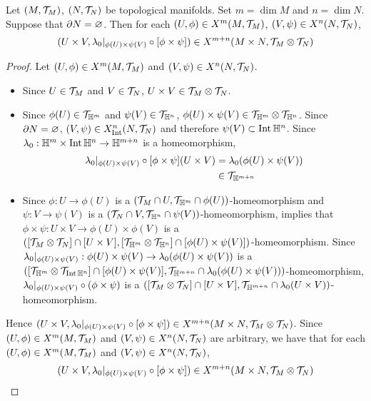 \documentclass{book}
\begin{document}
\begin{ex} 
	Let $(M, \mathcal{T}_M)$, $(N, \mathcal{T}_N)$ be topological manifolds. Set $m = \dim M$ and $n = \dim N$. Suppose that $\partial N = \varnothing$. Then for each $(U, \phi) \in X^m(M, \mathcal{T}_M)$, $(V, \psi) \in X^n(N, \mathcal{T}_N)$, 
	$$(U \times V, \lambda_0|_{\phi(U) \times \psi(V)} \circ [\phi \times \psi]) \in X^{m+n}(M \times N, \mathcal{T}_M \otimes \mathcal{T}_N)$$ 
\end{ex}

\begin{proof}
	Let $(U, \phi) \in X^m(M, \mathcal{T}_M)$ and $(V, \psi) \in X^n(N, \mathcal{T}_N)$. 
	\begin{itemize}
		\item Since $U \in \mathcal{T}_M$ and $V \in \mathcal{T}_N$, $U \times V \in \mathcal{T}_M \otimes \mathcal{T}_N$. 
		\item Since $\phi(U) \in \mathcal{T}_{\mathbb{H}^m}$ and $\psi(V) \in \mathcal{T}_{\mathbb{H}^n}$, $\phi(U) \times \psi(V) \in \mathcal{T}_{\mathbb{H}^m} \otimes \mathcal{T}_{\mathbb{H}^n}$. Since $\partial N = \varnothing$, $(V, \psi) \in X^n_{\operatorname{Int}}(N, \mathcal{T}_N)$ and therefore $\psi(V) \subset \operatorname{Int} \mathbb{H}^n$. Since $\lambda_0: \mathbb{H}^m \times \operatorname{Int} \mathbb{H}^n \rightarrow \mathbb{H}^{m+n}$ is a homeomorphism, 
		\begin{align*}
			\lambda_0|_{\phi(U) \times \psi(V)} \circ [\phi \times \psi](U \times V)
			& = \lambda_0 (\phi(U) \times \psi(V)) \\
			& \in \mathcal{T}_{\mathbb{H}^{m+n}}
		\end{align*}
		\item Since $\phi:U \rightarrow \phi(U)$ is a $(\mathcal{T}_M \cap U, \mathcal{T}_{\mathbb{H}^m} \cap \phi(U))$-homeomorphism and $\psi: V \rightarrow \psi(V)$ is a $(\mathcal{T}_N \cap V, \mathcal{T}_{\mathbb{H}^n} \cap \psi(V))$-homeomorphism,  implies that $\phi \times \psi: U \times V \rightarrow \phi(U) \times \phi(V)$ is a $([\mathcal{T}_M \otimes \mathcal{T}_N] \cap [U \times V], [\mathcal{T}_{\mathbb{H}^m} \otimes \mathcal{T}_{\mathbb{H}^n}] \cap [\phi(U) \times \psi(V)])$-homeomorphism. Since $\lambda_0|_{\phi(U) \times \psi(V)}: \phi(U) \times \psi(V) \rightarrow \lambda_0(\phi(U) \times \psi(V))$ is a $([\mathcal{T}_{\mathbb{H}^m} \otimes \mathcal{T}_{\operatorname{Int} \mathbb{H}^n}] \cap[ \phi(U) \times \psi(V)], \mathcal{T}_{\mathbb{H}^{m+n}} \cap \lambda_0(\phi(U) \times \psi(V)))$-homeomorphism, $\lambda_0|_{\phi(U) \times \psi(V)} \circ (\phi \times \psi)$ is a $([\mathcal{T}_M \otimes \mathcal{T}_N] \cap [U \times V], \mathcal{T}_{\mathbb{H}^{m+n}} \cap \lambda_0(U \times V))$-homeomorphism.
	\end{itemize}
	Hence $(U \times V,\lambda_0|_{\phi(U) \times \psi(V)} \circ [\phi \times \psi]) \in X^{m+n}(M \times N, \mathcal{T}_M \otimes \mathcal{T}_N)$. Since $(U, \phi) \in X^m(M, \mathcal{T}_M)$ and $(V, \psi) \in X^n(N, \mathcal{T}_N)$ are arbitrary, we have that for each $(U, \phi) \in X^m(M, \mathcal{T}_M)$ and $(V, \psi) \in X^n(N, \mathcal{T}_N)$, $$(U \times V, \lambda_0|_{\phi(U) \times \psi(V)} \circ [\phi \times \psi]) \in X^{m+n}(M \times N,  \mathcal{T}_M \otimes \mathcal{T}_N)$$ 
\end{proof}
\end{document}
